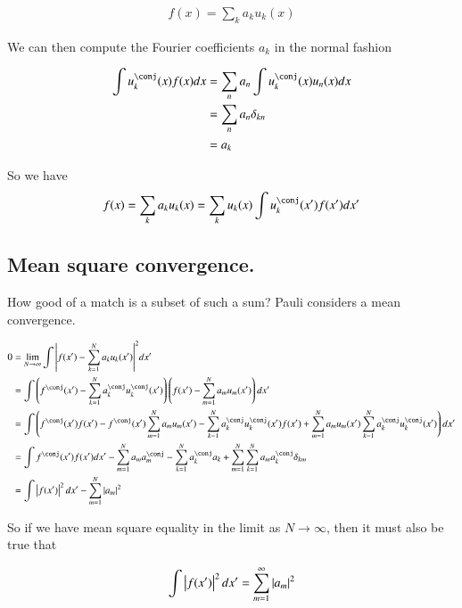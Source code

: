 \begin{align*}
f(x) = \sum_k a_k u_k(x)
\end{align*}

We can then compute the Fourier coefficients $a_k$ in the normal fashion

\begin{align*}
\int u_k^\conj(x) f(x) dx 
&= \sum_n a_n \int u_k^\conj(x) u_n(x) dx \\
&= \sum_n a_n \delta_{kn} \\
&= a_k \\
\end{align*}

So we have 
\begin{align*}
f(x) = \sum_k a_k u_k(x)  = \sum_k u_k(x) \int u_k^\conj(x') f(x') dx'
\end{align*}

\subsection{Mean square convergence. }

How good of a match is a subset of such a sum?  Pauli considers a mean convergence.

\begin{align*}
0 &= \lim_{N \rightarrow \infty}\int 
{\Abs{f(x') -\sum_{k=1}^N a_k u_k(x') }}^2 dx'  \\
&=
\int \left(f^\conj(x') -\sum_{k=1}^N a_k^\conj u_k^\conj(x') \right) \left(f(x') - \sum_{m=1}^N a_m u_m(x') \right) 
dx' \\
&=
\int 
\left( f^\conj(x') f(x') 
-f^\conj(x') \sum_{m=1}^N a_m u_m(x') 
- \sum_{k=1}^N a_k^\conj u_k^\conj(x') f(x') 
+ \sum_{m=1}^N a_m u_m(x') \sum_{k=1}^N a_k^\conj u_k^\conj(x')  \right)
dx' \\
&=
\int f^\conj(x') f(x') dx'
- \sum_{m=1}^N a_m a_m^\conj
- \sum_{k=1}^N a_k^\conj a_k
+ \sum_{m=1}^N \sum_{k=1}^N a_m a_k^\conj \delta_{km} \\
&= \int \Abs{f(x')}^2 dx' - \sum_{m=1}^N \Abs{a_m}^2 \\
\end{align*}

So if we have mean square equality in the limit as $N \rightarrow \infty$, then it must also be true that

\begin{align*}
\int \left\lvert{f(x')}\right\rvert^2 dx' = \sum_{m=1}^\infty \left\lvert{a_m}\right\rvert^2 \\
\end{align*}

